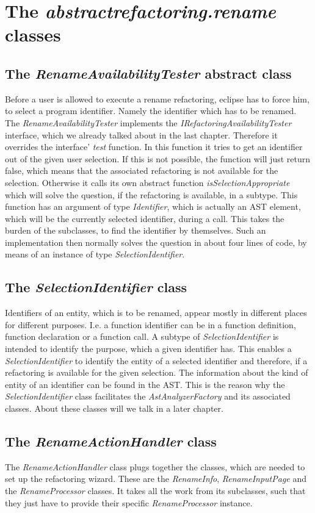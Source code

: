 \documentclass[a4paper,10pt]{report}
\begin{document}
\section{The {\it abstractrefactoring.rename} classes}
\subsection{The {\it RenameAvailabilityTester} abstract class}
Before a user is allowed to execute a rename refactoring, eclipse has to force him, to select a program identifier. Namely the identifier which has to be renamed.
The {\it RenameAvailabilityTester} implements the {\it IRefactoringAvailabilityTester} interface, which we already talked about in the last chapter.
Therefore it overrides the interface' {\it test} function. In this function it tries to get an identifier out of the given user selection. If this is not possible, the function will just return false, which means that the associated refactoring is not available for the selection.
Otherwise it calls its own abstract function {\it isSelectionAppropriate} which will solve the question, if the refactoring is available, in a subtype. This function has an argument of type {\it Identifier}, which is actually an AST element, which will be the currently selected identifier, during a call. 
This takes the burden of the subclasses, to find the identifier by themselves.
Such an implementation then normally solves the question in about four lines of code, by means of an instance of type {\it SelectionIdentifier}. 

\subsection{The {\it SelectionIdentifier} class}
Identifiers of an entity, which is to be renamed, appear mostly in different places for different purposes. I.e. a function identifier can be in a function definition, function declaration or a function call. 
A subtype of {\it SelectionIdentifier} is intended to identify the purpose, which a given identifier has.
This enables a {\it SelectionIdentifier} to identify the entity of a selected identifier and therefore, if a refactoring is available for the given selection. The information about the kind of entity of an identifier can  be found in the AST. 
This is the reason why the {\it SelectionIdentifier} class facilitates the {\it AstAnalyzerFactory} and its associated classes. About these classes will we talk in a later chapter.

\subsection{The {\it RenameActionHandler} class}
The {\it RenameActionHandler} class plugs together the classes, which are needed to set up the refactoring wizard. These are the {\it RenameInfo}, {\it RenameInputPage} and the {\it RenameProcessor} classes.
It takes all the work from its subclasses, such that they just have to provide their specific {\it RenameProcessor} instance.
\end{document}
